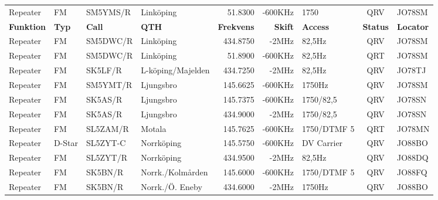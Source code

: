 \documentclass[10pt,swedish,a4paper,twoside]{article}
\begin{document}
\begin{landscape}
\begin{longtable}{llllrrlcl}
	Repeater          & FM           & SM5YMS/R      & Linköping         &           51.8300 &        -600KHz & 1750            &       QRV       & JO78SM           \\
		\textbf{Funktion} & \textbf{Typ} & \textbf{Call} & \textbf{QTH}        & \textbf{Frekvens} & \textbf{Skift} & \textbf{Access} & \textbf{Status} & \textbf{Locator} \\ \hline
	Repeater          & FM           & SM5DWC/R      & Linköping         &          434.8750 &          -2MHz & 82,5Hz          &       QRV       & JO78SM           \\
	Repeater          & FM           & SM5DWC/R      & Linköping         &           51.8900 &        -600KHz & 82,5Hz          &       QRT       & JO78SM           \\
	Repeater          & FM           & SK5LF/R       & L-köping/Majelden &          434.7250 &          -2MHz & 82,5Hz          &       QRV       & JO78TJ           \\
	Repeater          & FM           & SM5YMT/R      & Ljungsbro         &          145.6625 &        -600KHz & 1750Hz          &       QRV       & JO78SM           \\
	Repeater          & FM           & SK5AS/R       & Ljungsbro         &          145.7375 &        -600KHz & 1750/82,5       &       QRV       & JO78SN           \\
	Repeater          & FM           & SK5AS/R       & Ljungsbro         &          434.9000 &          -2MHz & 1750/82,5       &       QRV       & JO78SN           \\
	Repeater          & FM           & SL5ZAM/R      & Motala            &          145.7625 &        -600KHz & 1750/DTMF 5     &       QRT       & JO78MN           \\
	Repeater          & D-Star       & SL5ZYT-C      & Norrköping        &          145.5750 &        -600KHz & DV Carrier      &       QRV       & JO88BO           \\
	Repeater          & FM           & SL5ZYT/R      & Norrköping        &          434.9500 &          -2MHz & 82,5Hz          &       QRV       & JO88DQ           \\
	Repeater          & FM           & SK5BN/R       & Norrk./Kolmården  &          145.6000 &        -600KHz & 1750/DTMF 5     &       QRV       & JO88FQ           \\
	Repeater          & FM           & SK5BN/R       & Norrk./Ö. Eneby   &          434.6000 &          -2MHz & 1750Hz          &       QRV       & JO88BO           \\

\end{longtable}
\end{landscape}
\end{document}
